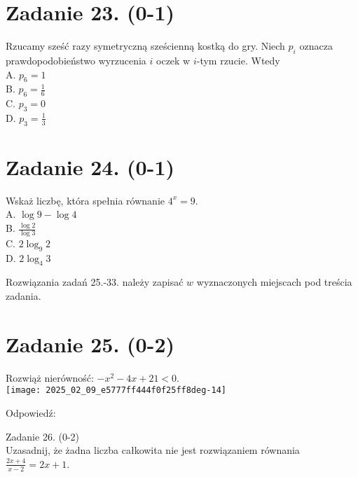 \documentclass[10pt]{article}
\begin{document}
\section*{Zadanie 23. (0-1)}
Rzucamy sześć razy symetryczną sześcienną kostką do gry. Niech \(p_{i}\) oznacza prawdopodobieństwo wyrzucenia \(i\) oczek w \(i\)-tym rzucie. Wtedy\\
A. \(p_{6}=1\)\\
B. \(p_{6}=\frac{1}{6}\)\\
C. \(p_{3}=0\)\\
D. \(p_{3}=\frac{1}{3}\)

\section*{Zadanie 24. (0-1)}
Wskaż liczbę, która spełnia równanie \(4^{x}=9\).\\
A. \(\log 9-\log 4\)\\
B. \(\frac{\log 2}{\log 3}\)\\
C. \(2 \log _{9} 2\)\\
D. \(2 \log _{4} 3\)

Rozwiązania zadań 25.-33. należy zapisać \(w\) wyznaczonych miejscach pod treścia zadania.

\section*{Zadanie 25. (0-2)}
Rozwiąż nierówność: \(-x^{2}-4 x+21<0\).\\
\texttt{[image: 2025\_02\_09\_e5777ff444f0f25ff8deg-14]}

Odpowiedź:

Zadanie 26. (0-2)\\
Uzasadnij, że żadna liczba całkowita nie jest rozwiązaniem równania \(\frac{2 x+4}{x-2}=2 x+1\).
\end{document}
